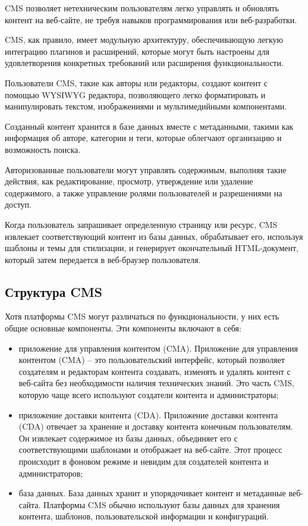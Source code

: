 CMS позволяет нетехническим пользователям легко управлять и обновлять контент на веб-сайте, не требуя навыков программирования или веб-разработки.

CMS, как правило, имеет модульную архитектуру, обеспечивающую легкую интеграцию плагинов и расширений, которые могут быть настроены для удовлетворения конкретных требований или расширения функциональности.

Пользователи CMS, такие как авторы или редакторы, создают контент с помощью  WYSIWYG редактора, позволяющего легко форматировать и манипулировать текстом, изображениями и мультимедийными компонентами.

Созданный контент хранится в базе данных вместе с метаданными, такими как информация об авторе, категории и теги, которые облегчают организацию и возможность поиска.

Авторизованные пользователи могут управлять содержимым, выполняя такие действия, как редактирование, просмотр, утверждение или удаление содержимого, а также управление ролями пользователей и разрешениями на доступ.

Когда пользователь запрашивает определенную страницу или ресурс, CMS извлекает соответствующий контент из базы данных, обрабатывает его, используя шаблоны и темы для стилизации, и генерирует окончательный HTML-документ, который затем передается в веб-браузер пользователя.

\subsection{Структура CMS}
Хотя платформы CMS могут различаться по функциональности, у них есть общие основные компоненты. Эти компоненты включают в себя:
\begin{itemize}
	\item приложение для управления контентом (CMA). Приложение для управления контентом (CMA) -- это пользовательский интерфейс, который позволяет создателям и редакторам контента создавать, изменять и удалять контент с веб-сайта без необходимости наличия технических знаний. Это часть CMS, которую чаще всего используют создатели контента и администраторы;
	\item приложение доставки контента (CDA). Приложение доставки контента (CDA) отвечает за хранение и доставку контента конечным пользователям. Он извлекает содержимое из базы данных, объединяет его с соответствующими шаблонами и отображает на веб-сайте. Этот процесс происходит в фоновом режиме и невидим для создателей контента и администраторов;
	\item база данных. База данных хранит и упорядочивает контент и метаданные веб-сайта. Платформы CMS обычно используют базы данных для хранения контента, шаблонов, пользовательской информации и конфигураций.
\end{itemize}

